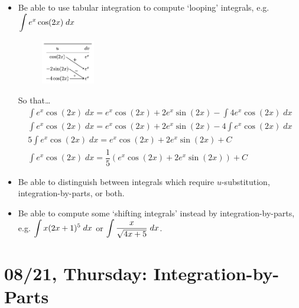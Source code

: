 \documentclass[11pt,letterpaper]{article}
\begin{document}
\begin{itemize}
\item Be able to use tabular integration to compute `looping' integrals, e.g. $\displaystyle\int e^x \cos(2x) \;dx$
	\begin{figure}[H]
	\centering
	\includegraphics[width=0.22\textwidth]{images/looping.png}
	\end{figure}
So that\dots
	\[
	\begin{gathered}
	\int e^{x} \cos(2x) \;dx= e^x \cos(2x) + 2 e^x \sin(2x) - \int 4 e^x \cos(2x) \;dx \\[0.3cm]
	\int e^{x} \cos(2x) \;dx= e^x \cos(2x) + 2 e^x \sin(2x) - 4 \int e^x \cos(2x) \;dx \\[0.3cm]
	5 \int e^{x} \cos(2x) \;dx= e^x \cos(2x) + 2 e^x \sin(2x) + C \\[0.3cm]
	\int e^{x} \cos(2x) \;dx= \dfrac{1}{5} \left( e^x \cos(2x) + 2 e^x \sin(2x) \right) + C
	\end{gathered}
	\]

\item Be able to distinguish between integrals which require $u$-substitution, integration-by-parts, or both. 

\item Be able to compute some `shifting integrals' instead by integration-by-parts, e.g. $\displaystyle\int x(2x + 1)^5 \;dx$ or $\displaystyle\int \dfrac{x}{\sqrt{4x + 5}} \;dx$.
\end{itemize}

\newpage
\section*{08/21, Thursday: Integration-by-Parts\label{08-21}}
\end{document}
